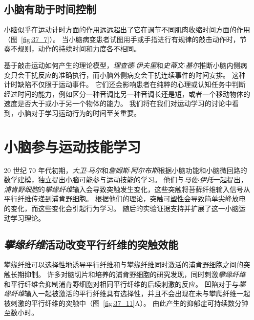 \subsection{小脑有助于时间控制}

小脑似乎在运动计时方面的作用远远超出了它在调节不同肌肉收缩时间方面的作用（图~\ref{fig:37_7}）。
当小脑病变患者试图用手或手指进行有规律的敲击动作时，节奏不规则，动作的持续时间和力度各不相同。


基于敲击运动如何产生的理论模型，\textit{理查德$\cdot$伊夫里}和\textit{史蒂文$\cdot$基尔}推断小脑内侧病变只会干扰反应的准确执行，而小脑外侧病变会干扰连续事件的时间安排。
这种计时缺陷不仅限于运动事件。
它们还会影响患者在纯粹的心理或认知任务中判断经过时间的能力，例如区分一种音调比另一种音调长还是短，或者一个移动物体的速度是否大于或小于另一个物体的能力。
我们将在我们对运动学习的讨论中看到，小脑对于学习运动行为的时间至关重要。



\section{小脑参与运动技能学习}

20 世纪 70 年代初期，\textit{大卫$\cdot$马尔}和\textit{詹姆斯$\cdot$阿尔布斯}根据小脑功能和小脑微回路的数学建模，独立提出小脑可能参与运动技能的学习。
他们与\textit{马佐$\cdot$伊托}一起提出，\textit{浦肯野细胞}的\textit{攀缘纤维}输入会导致突触发生变化，这些突触将苔藓纤维输入信号从平行纤维传递到浦肯野细胞。
根据他们的理论，突触可塑性会导致简单尖峰放电的变化，而这些变化会引起行为学习。
随后的实验证据支持并扩展了这一小脑运动学习理论。



\subsection{\textit{攀缘纤维}活动改变平行纤维的突触效能}

攀缘纤维可以选择性地诱导平行纤维和与攀缘纤维同时激活的浦肯野细胞之间的突触长期抑制。
许多对脑切片和培养的浦肯野细胞的研究发现，同时刺激\textit{攀缘纤维}和平行纤维会抑制浦肯野细胞对相同平行纤维的后续刺激的反应。
凹陷对于与\textit{攀缘纤维}输入一起被激活的平行纤维具有选择性，并且不会出现在未与攀爬纤维一起被刺激的平行纤维的突触中（图~\ref{fig:37_11}A）。
由此产生的抑郁症可持续数分钟至数小时。


